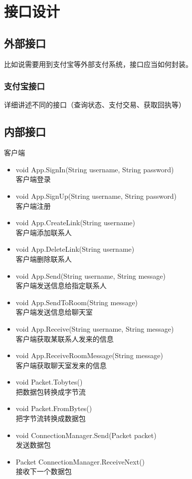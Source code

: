 \chapter{接口设计}
\section{外部接口}
比如说需要用到支付宝等外部支付系统，接口应当如何封装。

\subsection{支付宝接口}
详细讲述不同的接口（查询状态、支付交易、获取回执等）

\section{内部接口}
客户端
\begin{itemize}
	\item void App.SignIn(String username, String password) \\
	客户端登录
	\item void App.SignUp(String username, String password) \\
	客户端注册
	\item void App.CreateLink(String username)\\
	客户端添加联系人
	\item void App.DeleteLink(String username)\\
	客户端删除联系人
	\item void App.Send(String username, String message)\\
	客户端发送信息给指定联系人
	\item void App.SendToRoom(String message)\\
	客户端发送信息给聊天室
	\item void App.Receive(String username, String message)\\
	客户端获取某联系人发来的信息
	\item void App.ReceiveRoomMessage(String message)\\
	客户端获取聊天室发来的信息	
	\item void Packet.Tobytes() \\
	把数据包转换成字节流
	\item void Packet.FromBytes() \\
	把字节流转换成数据包
	\item void ConnectionManager.Send(Packet packet)\\
	发送数据包
	\item Packet ConnectionManager.ReceiveNext() \\
	接收下一个数据包
\end{itemize}
